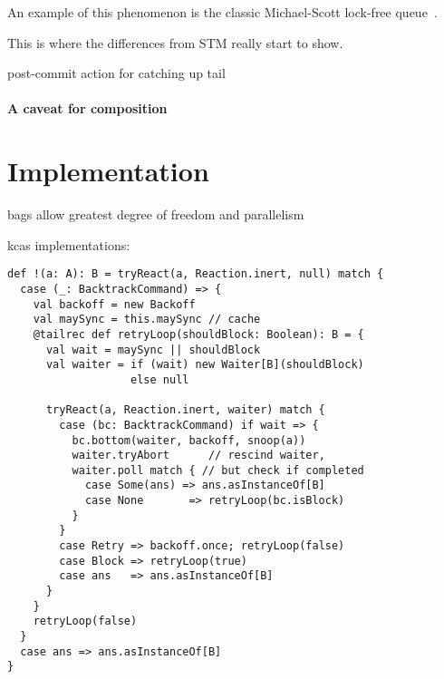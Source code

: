 \documentclass[preprint]{sigplanconf}
\begin{document}
An example of this phenomenon is the classic Michael-Scott lock-free
queue~\cite{?}. 

 

This is where the differences from STM really start to show.

post-commit action for catching up tail

\paragraph{A caveat for composition}

\section{Implementation}
\label{sec:implementation}

bags allow greatest degree of freedom and parallelism

kcas implementations: \cite{Attiya2008,Fraser2007,Luchangco2003}

\begin{lstlisting}
def !(a: A): B = tryReact(a, Reaction.inert, null) match {
  case (_: BacktrackCommand) => {
    val backoff = new Backoff
    val maySync = this.maySync // cache
    @tailrec def retryLoop(shouldBlock: Boolean): B = {
      val wait = maySync || shouldBlock
      val waiter = if (wait) new Waiter[B](shouldBlock) 
                   else null

      tryReact(a, Reaction.inert, waiter) match {
        case (bc: BacktrackCommand) if wait => {
          bc.bottom(waiter, backoff, snoop(a))
          waiter.tryAbort      // rescind waiter,
          waiter.poll match { // but check if completed
            case Some(ans) => ans.asInstanceOf[B] 
            case None       => retryLoop(bc.isBlock)
          }
        }
        case Retry => backoff.once; retryLoop(false)
        case Block => retryLoop(true)
        case ans   => ans.asInstanceOf[B]
      }
    }
    retryLoop(false)
  }
  case ans => ans.asInstanceOf[B]
}
\end{lstlisting}
\end{document}
